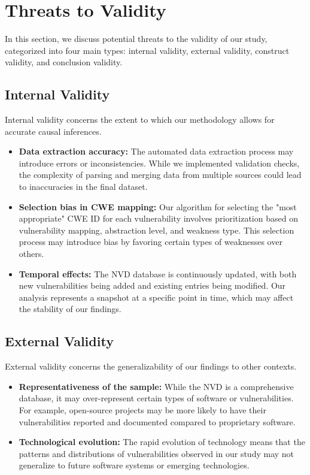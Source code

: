 \section{Threats to Validity}

In this section, we discuss potential threats to the validity of our study, categorized into four main types: internal validity, external validity, construct validity, and conclusion validity.

\subsection{Internal Validity}

Internal validity concerns the extent to which our methodology allows for accurate causal inferences.

\begin{itemize}
    \item \textbf{Data extraction accuracy:} The automated data extraction process may introduce errors or inconsistencies. While we implemented validation checks, the complexity of parsing and merging data from multiple sources could lead to inaccuracies in the final dataset.

    \item \textbf{Selection bias in CWE mapping:} Our algorithm for selecting the "most appropriate" CWE ID for each vulnerability involves prioritization based on vulnerability mapping, abstraction level, and weakness type. This selection process may introduce bias by favoring certain types of weaknesses over others.

    \item \textbf{Temporal effects:} The NVD database is continuously updated, with both new vulnerabilities being added and existing entries being modified. Our analysis represents a snapshot at a specific point in time, which may affect the stability of our findings.
\end{itemize}

\subsection{External Validity}

External validity concerns the generalizability of our findings to other contexts.

\begin{itemize}
    \item \textbf{Representativeness of the sample:} While the NVD is a comprehensive database, it may over-represent certain types of software or vulnerabilities. For example, open-source projects may be more likely to have their vulnerabilities reported and documented compared to proprietary software.

    \item \textbf{Technological evolution:} The rapid evolution of technology means that the patterns and distributions of vulnerabilities observed in our study may not generalize to future software systems or emerging technologies.
\end{itemize}

